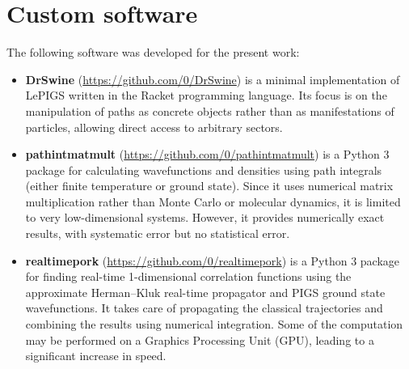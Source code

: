 \chapter{Custom software}

The following software was developed for the present work:

\begin{itemize}[itemsep=2 mm]
	\item \textbf{DrSwine} (\url{https://github.com/0/DrSwine}) is a minimal implementation of LePIGS written in the Racket programming language.
		Its focus is on the manipulation of paths as concrete objects rather than as manifestations of particles, allowing direct access to arbitrary sectors.
	\item \textbf{pathintmatmult} (\url{https://github.com/0/pathintmatmult}) is a Python 3 package for calculating wavefunctions and densities using path integrals (either finite temperature or ground state).
		Since it uses numerical matrix multiplication rather than Monte Carlo or molecular dynamics, it is limited to very low-dimensional systems.
		However, it provides numerically exact results, with systematic error but no statistical error.
	\item \textbf{realtimepork} (\url{https://github.com/0/realtimepork}) is a Python 3 package for finding real-time 1-dimensional correlation functions using the approximate Herman--Kluk real-time propagator and PIGS ground state wavefunctions.
		It takes care of propagating the classical trajectories and combining the results using numerical integration.
		Some of the computation may be performed on a Graphics Processing Unit (GPU), leading to a significant increase in speed.
\end{itemize}
